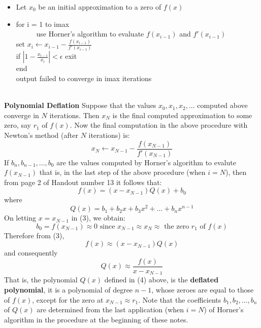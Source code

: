 \documentclass [titlepage,12pt,letter] {article}
\begin{document}
\begin{itemize} 
\item Let $x_0$ be an initial approximation to a zero of $f(x)$ 
\item 
for i = 1 to imax \\ 
$\;\;\;\;\;\;\;\;\;$ use Horner's algorithm to evaluate $f(x_{i-1})$ and $f'(x_{i-1})$ \\ 
\hspace{2cm} set $x_i \leftarrow x_{i-1} - \frac{f(x_{i-1})}{f'(x_{i-1})}$ \\ 
\hspace{2cm} if $| 1 - \frac{x_{i-1}}{x_i}| < \epsilon$ exit \\
end \\ 
output failed to converge in imax iterations
\end{itemize} 
\noindent 
\\
{\bf Polynomial Deflation} Suppose that the values $x_0, x_1, x_2, \dots $ computed above converge in $N$ iterations. Then $x_N$ is the final computed approximation to some zero, say $r_1$ of $f(x)$. Now the final computation in the above procedure with Newton's method (after $N$ iterations) is: 
\[
x_N \leftarrow x_{N-1} - \frac{f(x_{N-1})}{f'(x_{N-1})}
\] 
\noindent 
If $b_n, b_{n-1}, \dots, b_0$ are the values computed by Horner's algorithm to evalute $f(x_{N-1})$ that is, in the last step of the above procedure (when $i=N$), then from page 2 of Handout number 13 it follows that: 
\begin{equation} 
f(x) = (x - x_{N-1}) Q(x) + b_0
\end{equation}
\noindent 
where 
\begin{equation} 
Q(x) = b_1 + b_2 x + b_3 x^2 + \dots + b_n x^{n-1} 
\end{equation} 
\noindent 
On letting $x=x_{N-1}$ in (3), we obtain: 
\[
 b_0 = f(x_{N-1}) \approx 0 \mbox{ since }  x_{N-1} \approx x_{N} \approx \mbox{ the zero } r_{1} \mbox{ of } f(x) 
\]
\noindent 
Therefore from (3), 
\[
f(x) \approx (x-x_{N-1}) Q(x) 
\]
\noindent 
and consequently 
\[ 
Q(x) \approx \frac{f(x)}{x-x_{N-1}} 
\]
That is, the polynomial $Q(x)$ defined in (4) above, is the {\bf deflated polynomial}, it is a polynomial of degree $n-1$, whose zeroes are equal to those of $f(x)$, except for the zero at $x_{N-1} \approx r_1$. Note that the coefficients $b_1, b_2, \dots, b_n$ of $Q(x)$ are determined from the last application (when $i=N$) of Horner's algorithm in the procedure at the beginning of these notes. 
\\
\end{document}
